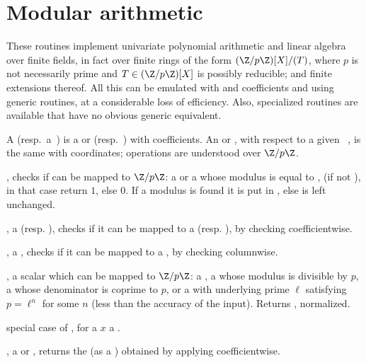 \section{Modular arithmetic}

\noindent These routines implement univariate polynomial arithmetic and
linear algebra over finite fields, in fact over finite rings of the form
$(\Z/p\Z)[X]/(T)$, where $p$ is not necessarily prime and $T\in(\Z/p\Z)[X]$ is
possibly reducible; and finite extensions thereof. All this can be emulated
with  and  coefficients and using generic routines,
at a considerable loss of efficiency. Also, specialized routines are
available that have no obvious generic equivalent.

 A 
(resp.~a~) is a  or  (resp.~) with
 coefficients. An  or , with respect to a given
~, is the same with  coordinates; operations are
understood over $\Z/p\Z$.


, checks if  can be mapped to
$\Z/p\Z$: a  or a  whose modulus is equal to ,
(if  not ), in that case return $1$, else $0$. If a modulus
is found it is put in , else  is left unchanged.

,  a  (resp. ),
checks if it can be mapped to a  (resp. ), by checking
 coefficientwise.

,  a ,
checks if it can be mapped to a , by checking 
columnwise.

,  a scalar which can be mapped to
$\Z/p\Z$: a , a  whose modulus is divisible by $p$,
a  whose denominator is coprime to $p$, or a  with
underlying prime $\ell$ satisfying $p = \ell^n$ for some $n$ (less than the
accuracy of the input). Returns , normalized.

 special case of ,
for a $x$ a .

,  a  or ,
returns the  (as a ) obtained by applying 
coefficientwise.

